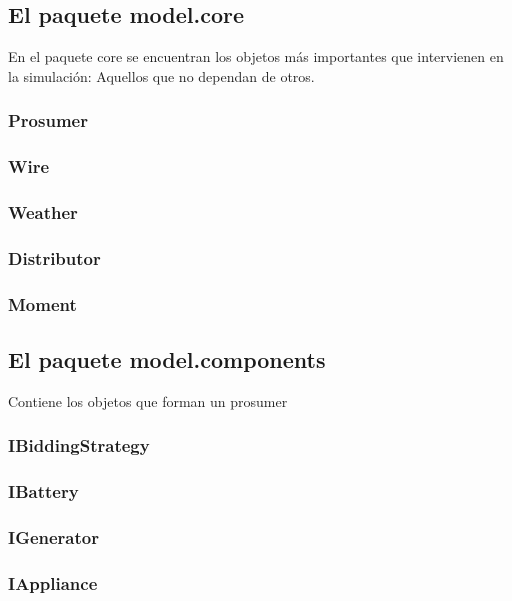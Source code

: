 \documentclass[12pt,a4paper,openright,oneside]{article}
\numberwithin{equation}{section}
\theoremstyle{definition}
\begin{document}
\subsection{El paquete model.core}
En el paquete core se encuentran los objetos más importantes que intervienen en la simulación: Aquellos que no dependan de otros.
\subsubsection{Prosumer}

\subsubsection{Wire}

\subsubsection{Weather}

\subsubsection{Distributor}

\subsubsection{Moment}

\subsection{El paquete model.components} 
Contiene los objetos que forman un prosumer
\subsubsection{IBiddingStrategy}

\subsubsection{IBattery}

\subsubsection{IGenerator}

\subsubsection{IAppliance}
\end{document}
